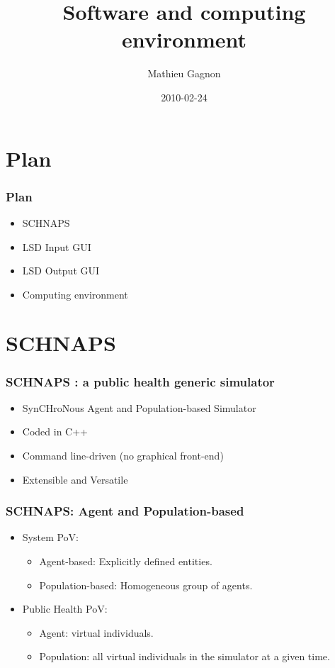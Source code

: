 \documentclass[notes, handout]{beamer}
\title[LSD Software]{Software and computing environment}
\author{Mathieu Gagnon}
\institute[LSD, U. Laval]{LSD \\ Laval University}
\date{2010-02-24}
\begin{document}
\frame{\titlepage}

\section*{Plan}

\begin{frame}
	\frametitle{Plan}
	\begin{itemize}
		\item SCHNAPS
		\item LSD Input GUI
		\item LSD Output GUI
		\item Computing environment
	\end{itemize}
\end{frame}

\section*{SCHNAPS}

\begin{frame}
	\frametitle{SCHNAPS : a public health generic simulator}
	\begin{itemize}
		\item SynCHroNous Agent and Population-based Simulator
		\item Coded in C++
		\item Command line-driven (no graphical front-end)
		\item Extensible and Versatile
	\end{itemize}
\end{frame}

\begin{frame}
	\frametitle{SCHNAPS: Agent and Population-based}
	\begin{itemize}
		\item<1-> System PoV:
			\begin{itemize}
				\item Agent-based: Explicitly defined entities.
				\item Population-based: Homogeneous group of agents.
			\end{itemize}
		\item<2-> Public Health PoV:
			\begin{itemize}
				\item Agent: virtual individuals.
				\item Population: all virtual individuals in the simulator at a given time.
			\end{itemize}
	\end{itemize}
\end{frame}
\end{document}
